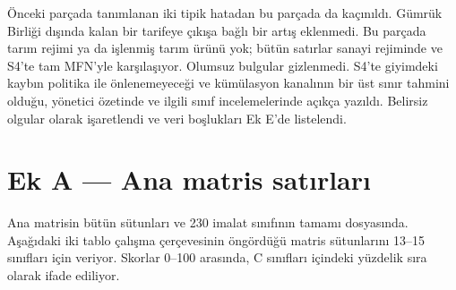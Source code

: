 Önceki parçada tanımlanan iki tipik hatadan bu parçada da kaçınıldı. Gümrük Birliği dışında kalan bir tarifeye çıkışa bağlı bir artış eklenmedi. Bu parçada tarım rejimi ya da işlenmiş tarım ürünü yok; bütün satırlar sanayi rejiminde ve S4'te tam MFN'yle karşılaşıyor. Olumsuz bulgular gizlenmedi. S4'te giyimdeki kaybın politika ile önlenemeyeceği ve kümülasyon kanalının bir üst sınır tahmini olduğu, yönetici özetinde ve ilgili sınıf incelemelerinde açıkça yazıldı. Belirsiz olgular \etiketD{} olarak işaretlendi ve veri boşlukları Ek E'de listelendi.

\hypertarget{nace_kartlar_13-15-ek-a--ana-matris-satux131rlarux131}{%
\section{Ek A --- Ana matris satırları}\label{nace_kartlar_13-15-ek-a--ana-matris-satux131rlarux131}}

Ana matrisin bütün sütunları ve 230 imalat sınıfının tamamı  dosyasında. Aşağıdaki iki tablo çalışma çerçevesinin öngördüğü matris sütunlarını 13--15 sınıfları için veriyor. Skorlar 0--100 arasında, C sınıfları içindeki yüzdelik sıra olarak ifade ediliyor.

